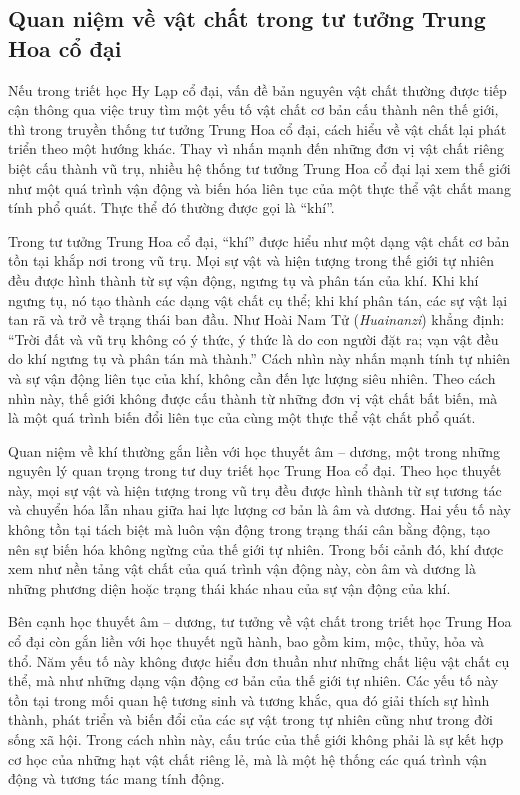 \documentclass[14pt,a4paper]{extarticle}
\begin{document}
\subsection{Quan niệm về vật chất trong tư tưởng Trung Hoa cổ đại}

Nếu trong triết học Hy Lạp cổ đại, vấn đề bản nguyên vật chất thường được tiếp cận thông qua việc truy tìm một yếu tố vật chất cơ bản cấu thành nên thế giới, thì trong truyền thống tư tưởng Trung Hoa cổ đại, cách hiểu về vật chất lại phát triển theo một hướng khác. Thay vì nhấn mạnh đến những đơn vị vật chất riêng biệt cấu thành vũ trụ, nhiều hệ thống tư tưởng Trung Hoa cổ đại lại xem thế giới như một quá trình vận động và biến hóa liên tục của một thực thể vật chất mang tính phổ quát. Thực thể đó thường được gọi là ``khí''.

Trong tư tưởng Trung Hoa cổ đại, ``khí'' được hiểu như một dạng vật chất cơ bản tồn tại khắp nơi trong vũ trụ. Mọi sự vật và hiện tượng trong thế giới tự nhiên đều được hình thành từ sự vận động, ngưng tụ và phân tán của khí. Khi khí ngưng tụ, nó tạo thành các dạng vật chất cụ thể; khi khí phân tán, các sự vật lại tan rã và trở về trạng thái ban đầu. Như Hoài Nam Tử (\emph{Huainanzi}) khẳng định: ``Trời đất và vũ trụ không có ý thức, ý thức là do con người đặt ra; vạn vật đều do khí ngưng tụ và phân tán mà thành.''\cite{hoainamtu} Cách nhìn này nhấn mạnh tính tự nhiên và sự vận động liên tục của khí, không cần đến lực lượng siêu nhiên. Theo cách nhìn này, thế giới không được cấu thành từ những đơn vị vật chất bất biến, mà là một quá trình biến đổi liên tục của cùng một thực thể vật chất phổ quát.

Quan niệm về khí thường gắn liền với học thuyết âm -- dương, một trong những nguyên lý quan trọng trong tư duy triết học Trung Hoa cổ đại. Theo học thuyết này, mọi sự vật và hiện tượng trong vũ trụ đều được hình thành từ sự tương tác và chuyển hóa lẫn nhau giữa hai lực lượng cơ bản là âm và dương. Hai yếu tố này không tồn tại tách biệt mà luôn vận động trong trạng thái cân bằng động, tạo nên sự biến hóa không ngừng của thế giới tự nhiên. Trong bối cảnh đó, khí được xem như nền tảng vật chất của quá trình vận động này, còn âm và dương là những phương diện hoặc trạng thái khác nhau của sự vận động của khí.

Bên cạnh học thuyết âm -- dương, tư tưởng về vật chất trong triết học Trung Hoa cổ đại còn gắn liền với học thuyết ngũ hành, bao gồm kim, mộc, thủy, hỏa và thổ. Năm yếu tố này không được hiểu đơn thuần như những chất liệu vật chất cụ thể, mà như những dạng vận động cơ bản của thế giới tự nhiên. Các yếu tố này tồn tại trong mối quan hệ tương sinh và tương khắc, qua đó giải thích sự hình thành, phát triển và biến đổi của các sự vật trong tự nhiên cũng như trong đời sống xã hội. Trong cách nhìn này, cấu trúc của thế giới không phải là sự kết hợp cơ học của những hạt vật chất riêng lẻ, mà là một hệ thống các quá trình vận động và tương tác mang tính động.
\end{document}
